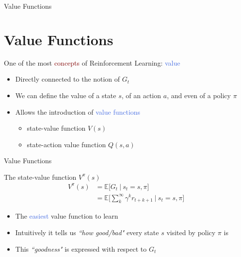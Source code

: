 \documentclass{beamer}
\begin{document}
\begin{frame}{Value Functions}
	\section{Value Functions}

	One of the most \textcolor{Maroon}{concepts} of Reinforcement Learning: \textcolor{RoyalBlue}{value}
	\begin{itemize}
		\item Directly connected to the notion of $G_t$
		\item We can define the value of a state $s$, of an action $a$, and even of a policy $\pi$
		\item Allows the introduction of \textcolor{RoyalBlue}{value functions}
			\begin{itemize}
				\item state-value function $V(s)$
				\item state-action value function $Q(s,a)$
			\end{itemize}
	\end{itemize}
\end{frame}

\begin{frame}{Value Functions}
	\begin{block}{The state-value function $V^{\pi}(s)$}
		\begin{align*}
			V^{\pi}(s) & = \mathds{E} \bigg[G_t \: \big| \: s_t=s,\pi \bigg] \\ 
				& = \mathds{E} \bigg[\sum_{k}^{\infty}\gamma^{k} r_{t+k+1} \: \bigg| \: s_t=s,\pi \bigg]
		\end{align*}
	\end{block}

	\begin{itemize}
		\item The \textcolor{RoyalBlue}{easiest} value function to learn
		\item Intuitively it tells us \textit{``how good/bad"} every state $s$ visited by policy $\pi$ is
		\item This \textit{``goodness"} is expressed with respect to $G_t$
	\end{itemize}

\end{frame}
\end{document}
